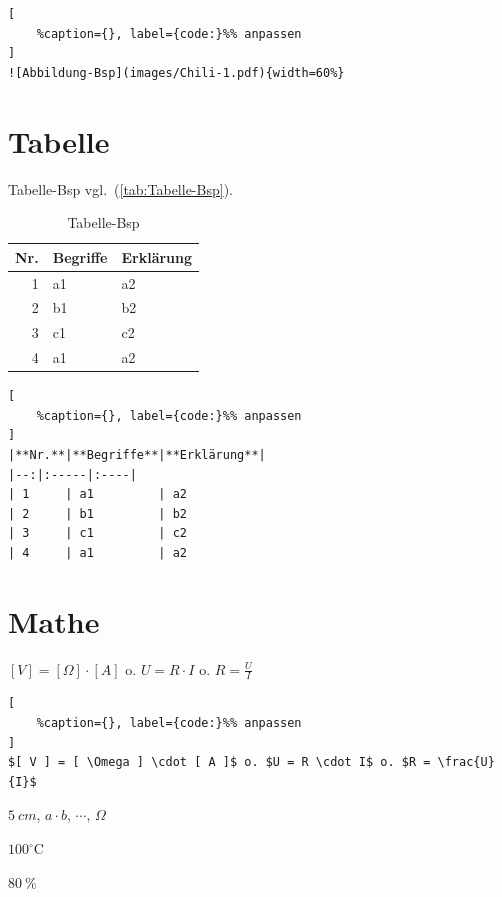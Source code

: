 \lstset{language=C}%
\begin{lstlisting}[
	%caption={}, label={code:}%% anpassen
]
![Abbildung-Bsp](images/Chili-1.pdf){width=60%}
\end{lstlisting}

\section{Tabelle}\label{tabelle}

Tabelle-Bsp vgl.~(\autoref{tab:Tabelle-Bsp}).

\begin{table}[!ht]%
\centering 
	\caption{Tabelle-Bsp} \label{tab:Tabelle-Bsp}%
\begin{tabular}{@{}rll@{}}
\toprule
\textbf{Nr.} & \textbf{Begriffe} & \textbf{Erklärung}\\
\midrule
1 & a1 & a2\\
2 & b1 & b2\\
3 & c1 & c2\\
4 & a1 & a2\\
\bottomrule
\end{tabular} 
\end{table}

\lstset{language=C}%
\begin{lstlisting}[
	%caption={}, label={code:}%% anpassen
]
|**Nr.**|**Begriffe**|**Erklärung**|
|--:|:-----|:----|
| 1     | a1         | a2          
| 2     | b1         | b2          
| 3     | c1         | c2          
| 4     | a1         | a2          
\end{lstlisting}

\section{Mathe}\label{mathe}

$[ V ] = [ \Omega ] \cdot [ A ]$ o. $U = R \cdot I$ o.
$R = \frac{U}{I}$

\lstset{language=C}%
\begin{lstlisting}[
	%caption={}, label={code:}%% anpassen
]
$[ V ] = [ \Omega ] \cdot [ A ]$ o. $U = R \cdot I$ o. $R = \frac{U}{I}$
\end{lstlisting}

$5~cm$, $a \cdot b$, $\cdots$, $\Omega$

$100^\circ\text{C}$

$80~\%$

